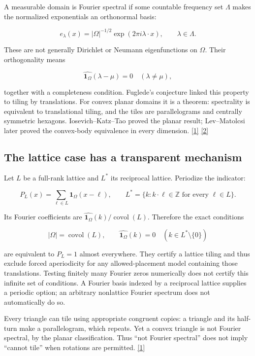 \documentclass[11pt]{article}
\begin{document}
A measurable domain is Fourier spectral if some countable frequency set \(\Lambda\) makes the normalized exponentials an orthonormal basis:


\[ e_\lambda(x)=|\Omega|^{-1/2}\exp(2\pi i\lambda\cdot x),\qquad \lambda\in\Lambda. \]

These are not generally Dirichlet or Neumann eigenfunctions on \(\Omega\). Their orthogonality means


\[ \widehat{\mathbf 1_\Omega}(\lambda-\mu)=0\quad(\lambda\ne\mu), \]

together with a completeness condition. Fuglede's conjecture linked this property to tiling by translations. For convex planar domains it is a theorem: spectrality is equivalent to translational tiling, and the tiles are parallelograms and centrally symmetric hexagons. Iosevich--Katz--Tao proved the planar result; Lev--Matolcsi later proved the convex-body equivalence in every dimension. \hyperlink{ref1}{[1]} \hyperlink{ref2}{[2]}



\subsection*{The lattice case has a transparent mechanism}


Let \(L\) be a full-rank lattice and \(L^*\) its reciprocal lattice. Periodize the indicator:


\[ P_L(x)=\sum_{\ell\in L}\mathbf 1_\Omega(x-\ell),\qquad L^*=\{k:k\cdot\ell\in\mathbb Z\text{ for every }\ell\in L\}. \]

Its Fourier coefficients are \(\widehat{\mathbf 1_\Omega}(k)/\operatorname{covol}(L)\). Therefore the exact conditions


\[ |\Omega|=\operatorname{covol}(L),\qquad \widehat{\mathbf 1_\Omega}(k)=0\quad(k\in L^*\setminus\{0\}) \]

are equivalent to \(P_L=1\) almost everywhere. They certify a lattice tiling and thus exclude forced aperiodicity for any allowed-placement model containing those translations. Testing finitely many Fourier zeros numerically does not certify this infinite set of conditions. A Fourier basis indexed by a reciprocal lattice supplies a periodic option; an arbitrary nonlattice Fourier spectrum does not automatically do so.



Every triangle can tile using appropriate congruent copies: a triangle and its half-turn make a parallelogram, which repeats. Yet a convex triangle is not Fourier spectral, by the planar classification. Thus ``not Fourier spectral'' does not imply ``cannot tile'' when rotations are permitted. \hyperlink{ref1}{[1]}
\end{document}
